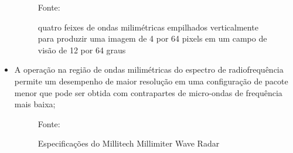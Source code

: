 \documentclass[xcolor=dvipsnames, aspectratio=169]{beamer}
\begin{document}
\begin{frame}
\begin{itemize}
        \begin{figure}
            \centering
            {Fonte: \cite{everett1995sensors}}
            \caption{quatro feixes de ondas milimétricas empilhados verticalmente para produzir uma imagem de 4 por 64 pixels em um campo de visão de 12 por 64 graus}
            \label{fig:militech_sensor_data}
        \end{figure}


        \item A operação na região de ondas milimétricas do espectro de radiofrequência permite um desempenho de maior resolução em uma configuração de pacote menor que pode ser obtida com contrapartes de micro-ondas de frequência mais baixa;

        \begin{figure}
            \centering
            {Fonte: \cite{everett1995sensors}}
            \caption{Especificações do Millitech Millimiter Wave Radar}
            \label{fig:militech_specs}
        \end{figure}

	\end{itemize}
\end{frame}
\end{document}
